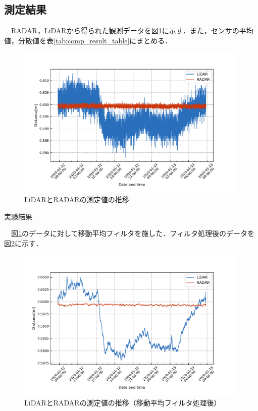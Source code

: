 \subsection{測定結果}
　RADAR，LiDARから得られた観測データを図\ref{fig:comparison_raw}に示す．また，センサの平均値，分散値を表\ref{tab:comp_result_table}にまとめる．
\begin{figure}[H]
    \centering
    \includegraphics[width=11cm]{./fig/comparison_raw.pdf}
    \caption{LiDARとRADARの測定値の推移}
    \label{fig:comparison_raw}
\end{figure}

\begin{table}[htbp]
    \centering
    \caption{実験結果}
    
    \label{tab:comp_result_table}
\end{table}


　図\ref{fig:comparison_raw}のデータに対して移動平均フィルタを施した．フィルタ処理後のデータを図\ref{fig:comparison_filtered60}に示す．
\begin{figure}[H]
    \centering
    \includegraphics[width=11cm]{./fig/comparison_filtered60.pdf}
    \caption{LiDARとRADARの測定値の推移（移動平均フィルタ処理後）}
    \label{fig:comparison_filtered60}
\end{figure}

